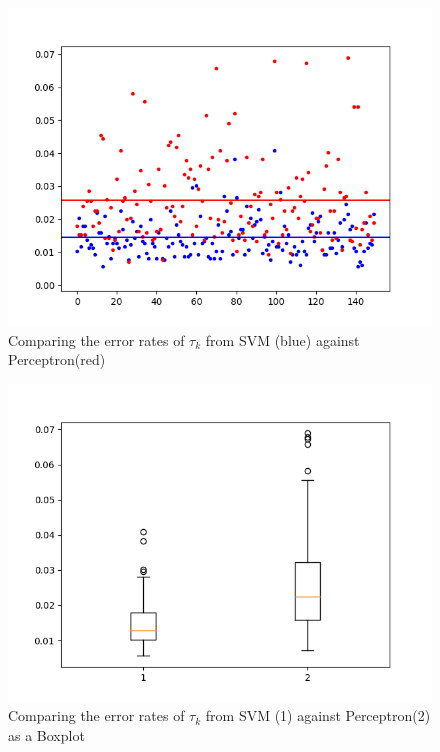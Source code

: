 \begin{figure}[!h]
\begin{center}
\centering
\includegraphics[width=1\textwidth]{figures/new/perc_vs_svm}
\end{center}
\caption{\label{fig:error_SVM_perc} Comparing the error rates of $\tau_k$ from SVM (blue) against Perceptron(red) }
\end{figure}


\begin{figure}[!h]
\begin{center}
\centering
\includegraphics[width=1\textwidth]{figures/new/perc_vs_svm_boxplot}
\end{center}
\caption{\label{fig:error_SVM_perc_boxplot} Comparing the error rates of $\tau_k$ from SVM (1) against Perceptron(2) as a Boxplot }
\end{figure}


